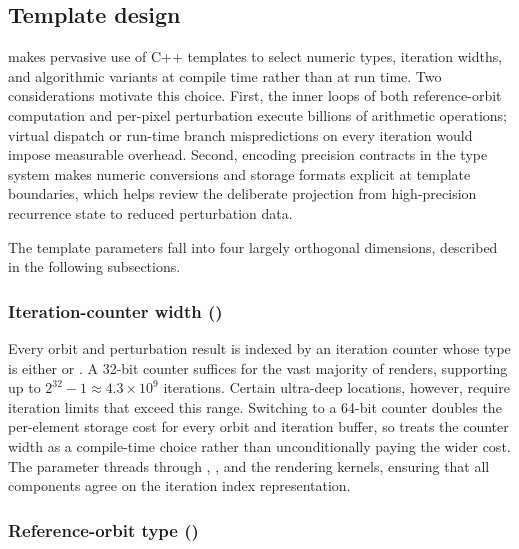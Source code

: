 \subsection{Template design}%
\label{sec:template-design}

\FractalShark{} makes pervasive use of C++ templates to select numeric
types, iteration widths, and algorithmic variants at compile time rather
than at run time.  Two considerations motivate this choice.  First,
the inner loops of both reference-orbit computation and per-pixel
perturbation execute billions of arithmetic operations; virtual dispatch
or run-time branch mispredictions on every iteration would impose
measurable overhead.  Second, encoding precision contracts in the type
system makes numeric conversions and storage formats explicit at template
boundaries, which helps review the deliberate projection from high-precision
recurrence state to reduced perturbation data.

The template parameters fall into four largely orthogonal dimensions,
described in the following subsections.


\subsubsection{Iteration-counter width ()}
\label{subsec:template-itertype}

Every orbit and perturbation result is indexed by an iteration counter
whose type is either  or .  A 32-bit
counter suffices for the vast majority of renders, supporting up to
$2^{32}-1 \approx 4.3\times10^{9}$ iterations.  Certain ultra-deep
locations, however, require iteration limits that exceed this range.
Switching to a 64-bit counter doubles the per-element storage cost for
every orbit and iteration buffer, so \FractalShark{} treats the counter
width as a compile-time choice rather than unconditionally paying the
wider cost.  The  parameter threads through
, , and the rendering
kernels, ensuring that all components agree on the iteration index
representation.


\subsubsection{Reference-orbit type ()}
\label{subsec:template-t}


